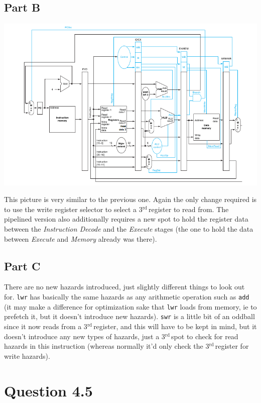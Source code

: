 \documentclass[11pt]{article} %
\newcommand{\code}[1]{\texttt{#1}}
\newcommand{\rd}{$^{\text{rd}\ }$}
\begin{document}
\subsection{Part B}

\includegraphics[width=\textwidth]{pipelineCPU2.png}

This picture is very similar to the previous one. Again the only change required is to use the write register selector to select a 3\rd  register to read from. The pipelined version also additionally requires a new spot to hold the register data between the \emph{Instruction Decode} and the \emph{Execute} stages (the one to hold the data between \emph{Execute} and \emph{Memory} already was there).

\subsection{Part C}

There are no new hazards introduced, just slightly different things to look out for. \code{lwr} has basically the same hazards as any arithmetic operation such as \code{add} (it may make a difference for optimization sake that \code{lwr} loads from memory, ie to prefetch it, but it doesn't introduce new hazards). \code{swr} is a little bit of an oddball since it now reads from a 3\rd register, and this will have to be kept in mind, but it doesn't introduce any new types of hazards, just a 3\rd spot to check for read hazards in this instruction (whereas normally it'd only check the 3\rd register for write hazards).


\section{Question 4.5}
\end{document}
